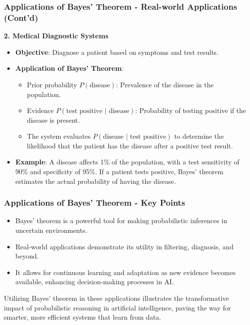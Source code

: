 \documentclass[aspectratio=169]{beamer}
\begin{document}
\begin{frame}[fragile]
    \frametitle{Applications of Bayes' Theorem - Real-world Applications (Cont'd)}
    \textbf{2. Medical Diagnostic Systems}
    \begin{itemize}
        \item \textbf{Objective}: Diagnose a patient based on symptoms and test results.
        \item \textbf{Application of Bayes' Theorem}:
        \begin{itemize}
            \item Prior probability \(P(\text{disease})\): Prevalence of the disease in the population.
            \item Evidence \(P(\text{test positive | disease})\): Probability of testing positive if the disease is present.
            \item The system evaluates \(P(\text{disease | test positive})\) to determine the likelihood that the patient has the disease after a positive test result.
        \end{itemize}
        \item \textbf{Example}: A disease affects 1\% of the population, with a test sensitivity of 90\% and specificity of 95\%. If a patient tests positive, Bayes’ theorem estimates the actual probability of having the disease.
    \end{itemize}
\end{frame}

\begin{frame}[fragile]
    \frametitle{Applications of Bayes' Theorem - Key Points}
    \begin{itemize}
        \item Bayes' theorem is a powerful tool for making probabilistic inferences in uncertain environments.
        \item Real-world applications demonstrate its utility in filtering, diagnosis, and beyond.
        \item It allows for continuous learning and adaptation as new evidence becomes available, enhancing decision-making processes in AI.
    \end{itemize}
    
    Utilizing Bayes' theorem in these applications illustrates the transformative impact of probabilistic reasoning in artificial intelligence, paving the way for smarter, more efficient systems that learn from data.
\end{frame}
\end{document}
